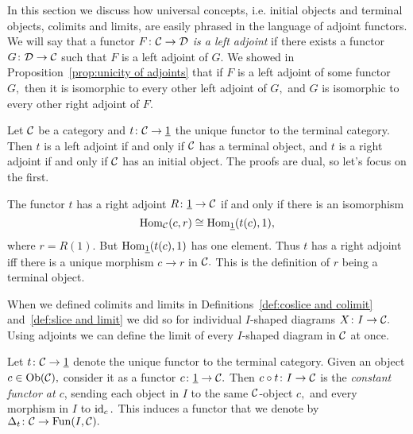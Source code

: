 \documentclass[../main/CT4S-EN-RU]{subfiles}
\begin{document}
\begin{blockENG}
In this section we discuss how universal concepts, i.e. initial objects and terminal objects, colimits and limits, are easily phrased in the language of adjoint functors. We will say that a functor $F\colon\mathcal{C}\rightarrow\mathcal{D}$ {\em is a left adjoint} if there exists a functor $G\colon\mathcal{D}\rightarrow\mathcal{C}$ such that $F$ is a left adjoint of $G.$ We showed in Proposition~\ref{prop:unicity of adjoints} that if $F$ is a left adjoint of some functor $G,$ then it is isomorphic to every other left adjoint of $G,$ and $G$ is isomorphic to every other right adjoint of $F.$
\end{blockENG}

\begin{blockRUS}
\end{blockRUS}

\begin{exampleENG}
Let $\mathcal{C}$ be a category and $t\colon\mathcal{C}\rightarrow\underline{1}$ the unique functor to the terminal category. Then $t$ is a left adjoint if and only if $\mathcal{C}$ has a terminal object, and $t$ is a right adjoint if and only if $\mathcal{C}$ has an initial object. The proofs are dual, so let's focus on the first.

The functor $t$ has a right adjoint $R\colon\underline{1}\rightarrow\mathcal{C}$ if and only if there is an isomorphism $$\operatorname{Hom}_\mathcal{C}(c,r)\cong\operatorname{Hom}_{\underline{1}}(t(c),1),$$ where $r=R(1).$ But $\operatorname{Hom}_{\underline{1}}(t(c),1)$ has one element. Thus $t$ has a right adjoint iff there is a unique morphism $c\to r$ in $\mathcal{C}.$ This is the definition of $r$ being a terminal object.
\end{exampleENG}

\begin{exampleRUS}
\end{exampleRUS}

\begin{blockENG}
When we defined colimits and limits in Definitions~\ref{def:coslice and colimit} and~\ref{def:slice and limit} we did so for individual $I$-shaped diagrams $X\colon I\rightarrow\mathcal{C}.$ Using adjoints we can define the limit of every $I$-shaped diagram in $\mathcal{C}$ at once.
\end{blockENG}

\begin{blockRUS}
\end{blockRUS}

\begin{blockENG}
Let $t\colon\mathcal{C}\rightarrow\underline{1}$ denote the unique functor to the terminal category. Given an object $c\in\operatorname{Ob}(\mathcal{C}),$ consider it as a functor $c\colon\underline{1}\rightarrow\mathcal{C}.$ Then $c\circ t\colon I\rightarrow\mathcal{C}$ is the {\em constant functor at $c$}, sending each object in $I$ to the same $\mathcal{C}$-object $c,$ and every morphism in $I$ to $\operatorname{id}_c.$ This induces a functor that we denote by $\Delta_t\colon\mathcal{C}\rightarrow\operatorname{Fun}(I,\mathcal{C}).$
\end{blockENG}
\end{document}
